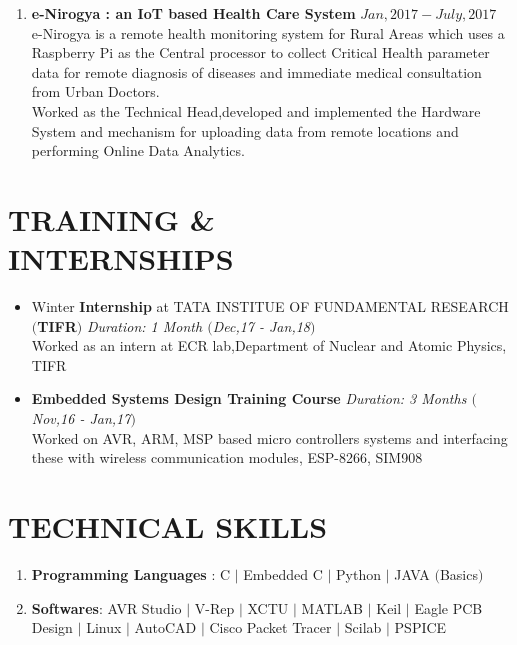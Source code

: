\documentclass[margin]{res}
\begin{document}
\begin{resume}
\begin{enumerate}
\item \textbf{ e-Nirogya : an IoT based Health Care System}                     \hfill             \(Jan,2017-July,2017\)\\
e-Nirogya is a remote health monitoring system for Rural Areas which uses a Raspberry Pi as the Central processor to collect Critical Health parameter data for remote diagnosis of diseases and immediate medical consultation from Urban Doctors.\\
Worked as the Technical Head,developed and implemented the Hardware System and mechanism for uploading data from remote locations and performing Online Data Analytics.   

\end{enumerate}

\section{TRAINING \&\\ INTERNSHIPS}
\begin{itemize}
  \item Winter \textbf{Internship} at TATA INSTITUE OF FUNDAMENTAL RESEARCH \textbf{$($TIFR$)$ }\hfill \textit{Duration: 1 Month $($Dec,17 - Jan,18$)$} \\
 Worked as an intern at ECR lab,Department of Nuclear and Atomic Physics, TIFR
  
  \item \textbf{Embedded Systems Design Training Course} \hfill \textit{Duration: 3 Months $($Nov,16 - Jan,17$)$} \\
 Worked on AVR, ARM, MSP based micro controllers systems and interfacing these with wireless communication modules, ESP-8266, SIM908
  
\end{itemize}

\section{TECHNICAL SKILLS}
\begin{enumerate}

\item \textbf{Programming Languages} : C $|$ Embedded C $|$  Python $|$  JAVA $($Basics$)$ 
\item \textbf{Softwares}: AVR Studio $|$ V-Rep $|$ XCTU $|$ MATLAB $|$ Keil $|$ Eagle PCB Design $|$ Linux $|$ AutoCAD $|$ Cisco Packet Tracer $|$ Scilab $|$ PSPICE


\end{enumerate}


\end{resume}
\end{document}
